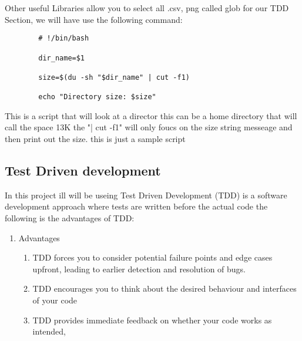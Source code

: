 	Other useful Libraries allow you to  select all  .csv, png  called glob
	for our TDD Section, we will have  use the  following command:
	\label{TDD sample bash}
	\begin{verbatim}
		# !/bin/bash

		dir_name=$1

		size=$(du -sh "$dir_name" | cut -f1)

		echo "Directory size: $size"
	\end{verbatim}
	This is a script that will look at a  director this can be a home directory that will call the  space 13K
	the "| cut -f1" will only foucs on the  size string messeage and then print out the  size. this is  just  a sample  script 
	\subsection{Test Driven development}
	In this  project ill will be useing  Test Driven Development (TDD) is a software development approach where tests are written before the actual code
	the following is the advantages of TDD:
	\begin{enumerate}
		\item Advantages
		\begin{enumerate}
			\item TDD forces you to consider potential failure points and edge cases upfront, leading to earlier detection and resolution of bugs.
			\item TDD encourages you to think about the desired behaviour and interfaces of your code
			\item TDD provides immediate feedback on whether your code works as intended,
		\end{enumerate}
	\end{enumerate}

